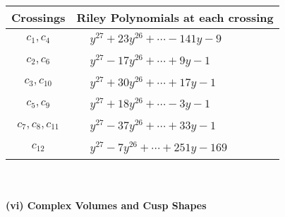 \documentclass[1p]{elsarticle_modified}
\theoremstyle{definition}
\begin{document}
\begin{tabular}{m{50pt}|m{274pt}}
Crossings & \hspace{64pt}Riley Polynomials at each crossing \\
\hline $$\begin{aligned}c_{1},c_{4}\end{aligned}$$&$\begin{aligned}
&y^{27}+23 y^{26}+\cdots-141 y-9
\end{aligned}$\\
\hline $$\begin{aligned}c_{2},c_{6}\end{aligned}$$&$\begin{aligned}
&y^{27}-17 y^{26}+\cdots+9 y-1
\end{aligned}$\\
\hline $$\begin{aligned}c_{3},c_{10}\end{aligned}$$&$\begin{aligned}
&y^{27}+30 y^{26}+\cdots+17 y-1
\end{aligned}$\\
\hline $$\begin{aligned}c_{5},c_{9}\end{aligned}$$&$\begin{aligned}
&y^{27}+18 y^{26}+\cdots-3 y-1
\end{aligned}$\\
\hline $$\begin{aligned}c_{7},c_{8},c_{11}\end{aligned}$$&$\begin{aligned}
&y^{27}-37 y^{26}+\cdots+33 y-1
\end{aligned}$\\
\hline $$\begin{aligned}c_{12}\end{aligned}$$&$\begin{aligned}
&y^{27}-7 y^{26}+\cdots+251 y-169
\end{aligned}$\\
\hline
\end{tabular}\\~\\
\newpage\flushleft \textbf{(vi) Complex Volumes and Cusp Shapes}
\end{document}
